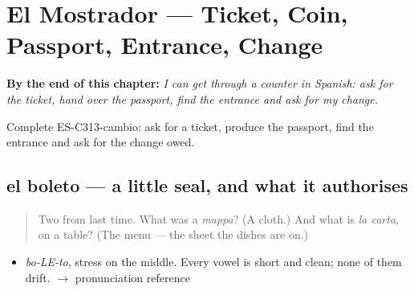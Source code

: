 
\chapter{El Mostrador --- Ticket, Coin, Passport, Entrance, Change}
\label{ch:el-mostrador}

\begin{chapteropening}
\textbf{By the end of this chapter:} \emph{I can get through a counter in Spanish: ask for the ticket, hand over the passport, find the entrance and ask for my change.}

Complete ES-C313-cambio: ask for a ticket, produce the passport, find the entrance and ask for the change owed.
\end{chapteropening}

\section[el boleto]{el boleto — a little seal, and what it authorises}

\label{lesson:ES-C313-boleto}



\begin{quote}
Two from last time. What was a \emph{mappa}? (A cloth.) And what is \emph{la carta}, on a table? (The menu — the sheet the dishes are on.)
\end{quote}

\begin{sounds}
\begin{itemize}
\raggedright
  \item \emph{bo-LE-to}, stress on the middle. Every vowel is short and clean; none of them drift. $\to$ pronunciation reference
\end{itemize}
\end{sounds}

